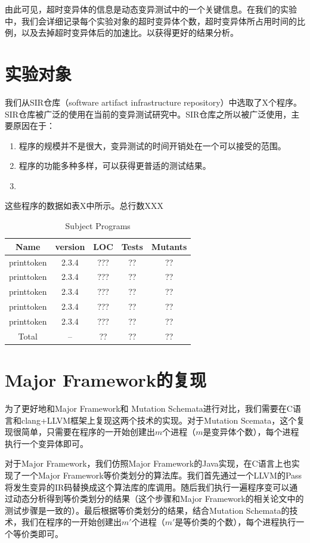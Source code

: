 \documentclass[nofonts]{ctexrep}
\begin{document}
由此可见，超时变异体的信息是动态变异测试中的一个关键信息。在我们的实验中，我们会详细记录每个实验对象的超时变异体个数，超时变异体所占用时间的比例，以及去掉超时变异体后的加速比。以获得更好的结果分析。

\section{实验对象}
我们从SIR仓库（software artifact infrastructure repository）中选取了X个程序。SIR仓库被广泛的使用在当前的变异测试研究中。SIR仓库之所以被广泛使用，主要原因在于：
\begin{enumerate}
\item
程序的规模并不是很大，变异测试的时间开销处在一个可以接受的范围。
\item
程序的功能多种多样，可以获得更普适的测试结果。
\item
\end{enumerate}

这些程序的数据如表X中所示。总行数XXX

\begin{table}[t]
  \centering
  \caption{Subject Programs}
  \label{tab:subjects}
  \begin{tabular}{|c|c|c|c|c|}
    \hline
    Name & version & LOC & Tests & Mutants\\
    \hline
    printtoken & 2.3.4 & ??? & ?? & ??\\
    printtoken & 2.3.4 & ??? & ?? & ??\\
    printtoken & 2.3.4 & ??? & ?? & ??\\
    printtoken & 2.3.4 & ??? & ?? & ??\\
    printtoken & 2.3.4 & ??? & ?? & ??\\
    \hline
    Total & -- &?? &??& ??\\
    \hline
  \end{tabular}
\end{table}
\section{Major Framework的复现}
为了更好地和Major Framework和 Mutation Schemata进行对比，我们需要在C语言和clang+LLVM框架上复现这两个技术的实现。对于Mutation Scemata，这个复现很简单，只需要在程序的一开始创建出$m$个进程（$m$是变异体个数），每个进程执行一个变异体即可。

对于Major Framework，我们仿照Major Framework的Java实现，在C语言上也实现了一个Major Framework等价类划分的算法库。我们首先通过一个LLVM的Pass将发生变异的IR码替换成这个算法库的库调用。随后我们执行一遍程序变可以通过动态分析得到等价类划分的结果（这个步骤和Major Framework的相关论文中的测试步骤是一致的）。最后根据等价类划分的结果，结合Mutation Schemata的技术，我们在程序的一开始创建出$m'$个进程（$m'$是等价类的个数），每个进程执行一个等价类即可。
\end{document}
